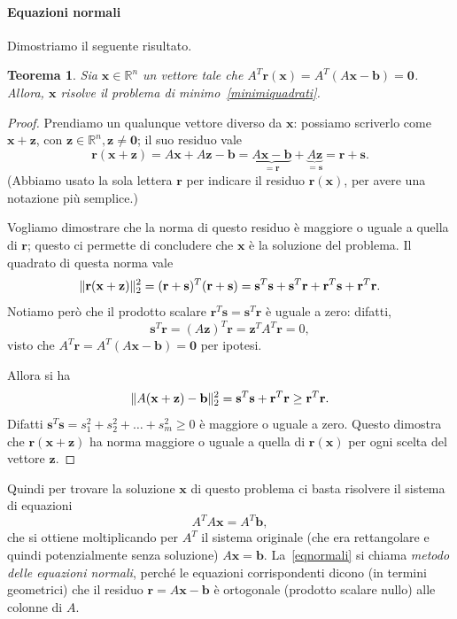 \documentclass[a4paper]{report}
\DeclarePairedDelimiter{\norm}{\lVert}{\rVert}
\newtheorem{theorem}{Teorema}[chapter]
\theoremstyle{definition}
\theoremstyle{remark}
\newcommand{\x}{\mathbf{x}}
\newcommand{\z}{\mathbf{z}}
\renewcommand{\b}{\mathbf{b}}
\begin{document}
\paragraph{Equazioni normali}  Dimostriamo il seguente risultato.
\begin{theorem}
Sia $\x\in\mathbb{R}^n$ un vettore tale che $A^T \mathbf{r}(\x) = A^T(A\x-\b) = \mathbf{0}$. Allora, $\x$ risolve il problema di minimo~\eqref{minimiquadrati}.
\end{theorem}
\begin{proof}
Prendiamo un qualunque vettore diverso da $\x$: possiamo scriverlo come $\x+\mathbf{z}$, con $\mathbf{z}\in\mathbb{R}^n, \mathbf{z} \neq \mathbf{0}$; il suo residuo vale
\[
\mathbf{r}(\x+\mathbf{z}) =  A\x+ A\mathbf{z}-\b = \underbrace{A\x-\b}_{=\mathbf{r}} + \underbrace{A\mathbf{z}}_{=\mathbf{s}} = \mathbf{r}+\mathbf{s}.
\]
(Abbiamo usato la sola lettera $\mathbf{r}$ per indicare il residuo $\mathbf{r}(\x)$, per avere una notazione più semplice.)

Vogliamo dimostrare che la norma di questo residuo è maggiore o uguale a quella di $\mathbf{r}$; questo ci permette di concludere che $\x$ è la soluzione del problema. Il quadrato di questa norma vale
\[
\norm{\mathbf{r}(\x+\mathbf{z})}_2^2 = (\mathbf{r}+\mathbf{s})^T(\mathbf{r}+\mathbf{s}) = \mathbf{s}^T \mathbf{s} + \mathbf{s}^T\mathbf{r} + \mathbf{r}^T \mathbf{s} + \mathbf{r}^T \mathbf{r}.
\]
Notiamo però che il prodotto scalare $\mathbf{r}^T\mathbf{s} = \mathbf{s}^T\mathbf{r}$ è uguale a zero: difatti,
\[
\mathbf{s}^T \mathbf{r} = (A\mathbf{z})^T \mathbf{r} = \mathbf{z}^T A^T \mathbf{r} = 0,
\]
visto che $A^T\mathbf{r} = A^T(A\x-\b) = \mathbf{0}$ per ipotesi.

Allora si ha
\[
\norm{A(\x+\mathbf{z})-\b}_2^2 = \mathbf{s}^T \mathbf{s} + \mathbf{r}^T \mathbf{r} \geq \mathbf{r}^T\mathbf{r}.
\]
Difatti $\mathbf{s}^T\mathbf{s} = s_1^2 + s_2^2 + \dots + s_m^2 \geq 0$ è maggiore o uguale a zero. Questo dimostra che $\mathbf{r}(\x +\mathbf{z})$ ha norma maggiore o uguale a quella di $\mathbf{r}(\x)$ per ogni scelta del vettore $\z$.
\end{proof}
Quindi per trovare la soluzione $\x$ di questo problema ci basta risolvere il sistema di equazioni
\begin{equation} \label{eqnormali}
    A^T A \x = A^T \b,    
\end{equation}
che si ottiene moltiplicando per $A^T$ il sistema originale (che era rettangolare e quindi potenzialmente senza soluzione) $A \x= \b$. La~\eqref{eqnormali} si chiama \emph{metodo delle equazioni normali}, perché le equazioni corrispondenti dicono (in termini geometrici) che il residuo $\mathbf{r}=A \x-\b$ è ortogonale (prodotto scalare nullo) alle colonne di $A$.
\end{document}
